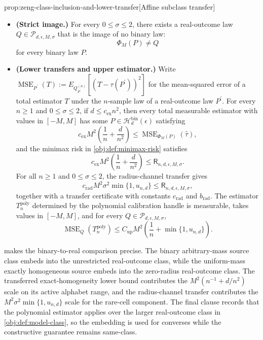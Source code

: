\begin{propositionv}{prop:zeng-class-inclusion-and-lower-transfer}[Affine subclass transfer]
\begin{itemize}
\item \textbf{(Strict image.)} For every \(0\le\sigma\le2\), there exists a real-outcome law \(Q\in\mathcal P_{d,\epsilon,M,\sigma}\) that is the image of no binary law:
\[
\Phi_M(P)\ne Q
\]
for every binary law \(P\).

\item \textbf{(Lower transfers and upper estimator.)} Write \(\operatorname{MSE}_{P^{\prime}}(T):=E_{Q_{P^{\prime}}^{(n)}}\left[\left(T-\tau(P^{\prime})\right)^2\right]\) for the mean-squared error of a total estimator \(T\) under the \(n\)-sample law of a real-outcome law \(P^{\prime}\). For every \(n\ge1\) and \(0\le\sigma\le2\), if \(d\le c_{\mathrm{ex}}n^2\), then every total measurable estimator with values in \([-M,M]\) has some \(P\in\mathcal H_d^{\mathrm{bin}}(\epsilon)\) satisfying
\[
c_{\mathrm{ex}}M^2\left(\frac1n+\frac{d}{n^2}\right)
\le
\operatorname{MSE}_{\Phi_M(P)}(\widehat\tau),
\]
and the minimax risk in \cref{obj:def:minimax-risk} satisfies
\[
c_{\mathrm{ex}}M^2\left(\frac1n+\frac{d}{n^2}\right)
\le
\mathsf R_{n,d,\epsilon,M,\sigma}.
\]
For all \(n\ge1\) and \(0\le\sigma\le2\), the radius-channel transfer gives
\[
c_{\mathrm{rad}}M^2\sigma^2\min\{1,u_{n,d}\}
\le
\mathsf R_{n,d,\epsilon,M,\sigma},
\]
together with a transfer certificate with constants \(c_{\mathrm{rad}}\) and \(b_{\mathrm{rad}}\).  The estimator \(T_n^{\mathrm{poly}}\) determined by the polynomial calibration handle is measurable, takes values in \([-M,M]\), and for every \(Q\in\mathcal P_{d,\epsilon,M,\sigma}\),
\[
\operatorname{MSE}_{Q}(T_n^{\mathrm{poly}})
\le
C_{\mathrm{up}}M^2\left(\frac1n+\min\{1,u_{n,d}\}\right).
\]
\end{itemize}
\end{propositionv}

 makes the binary-to-real comparison precise. The binary arbitrary-mass source class embeds into the unrestricted real-outcome class, while the uniform-mass exactly homogeneous source embeds into the zero-radius real-outcome class. The transferred exact-homogeneity lower bound contributes the \(M^2(n^{-1}+d/n^2)\) scale on its active alphabet range, and the radius-channel transfer contributes the \(M^2\sigma^2\min\{1,u_{n,d}\}\) scale for the rare-cell component. The final clause records that the polynomial estimator applies over the larger real-outcome class in \cref{obj:def:model-class}, so the embedding is used for converses while the constructive guarantee remains same-class.

